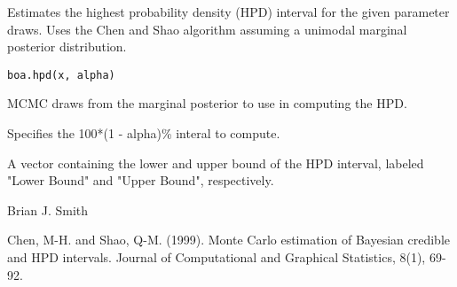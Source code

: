 \begin{Description}\relax
Estimates the highest probability density (HPD) interval for the given
parameter draws. Uses the Chen and Shao algorithm assuming a unimodal
marginal posterior distribution.
\end{Description}
\begin{Usage}
\begin{verbatim}
boa.hpd(x, alpha)
\end{verbatim}
\end{Usage}
\begin{Arguments}
\begin{ldescription}
\item[\code{x}] MCMC draws from the marginal posterior to use in computing the HPD.
\item[\code{alpha}] Specifies the 100*(1 - alpha)\% interal to compute.
\end{ldescription}
\end{Arguments}
\begin{Value}
A vector containing the lower and upper bound of the HPD interval, labeled
"Lower Bound" and "Upper Bound", respectively.
\end{Value}
\begin{Author}\relax
Brian J. Smith
\end{Author}
\begin{References}\relax
Chen, M-H. and Shao, Q-M. (1999). Monte Carlo estimation of Bayesian
credible and HPD intervals. Journal of Computational and Graphical Statistics,
8(1), 69-92.
\end{References}


